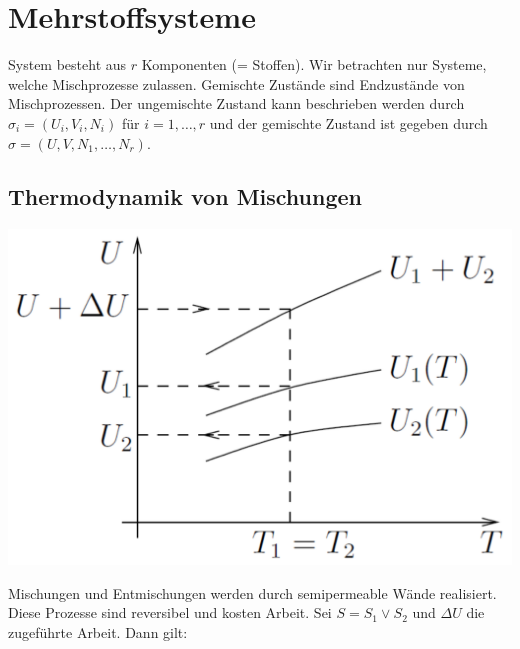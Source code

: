\section{Mehrstoffsysteme}

System besteht aus $r$ Komponenten (= Stoffen). Wir betrachten nur Systeme,
welche Mischprozesse zulassen. Gemischte Zustände sind Endzustände von
Mischprozessen. Der ungemischte Zustand kann beschrieben werden durch
$\sigma_i = (U_i,V_i,N_i)$ für $i=1,\dots,r$ und der gemischte Zustand ist
gegeben durch $\sigma = (U,V,N_1,\dots,N_r)$.

\subsection{Thermodynamik von Mischungen}

\begin{minipage}{0.25\textwidth}
    \centering
    \includegraphics[width=\textwidth]{Bilder/Mehrstoffsystem_U.png}
\end{minipage}
\begin{minipage}{0.23\textwidth}
    Mischungen und Entmischungen werden durch semipermeable Wände realisiert.
    Diese Prozesse sind reversibel und kosten Arbeit. Sei $S = S_1 \vee S_2$ und
    $\Delta U$ die zugeführte Arbeit. Dann gilt:
\end{minipage}

